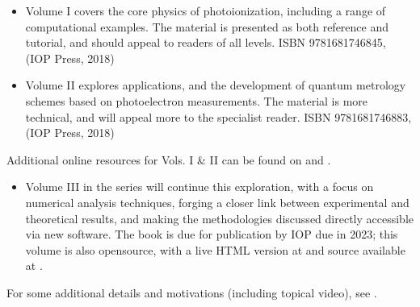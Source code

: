 \documentclass[letterpaper,10pt,english]{jupyterBook}
\begin{document}
\sphinxAtStartPar
{}
\begin{itemize}
\item {} 
\sphinxAtStartPar
Volume I covers the core physics of photoionization, including a range of computational examples. The material is presented as both reference and tutorial, and should appeal to readers of all levels. ISBN 978\sphinxhyphen{}1\sphinxhyphen{}6817\sphinxhyphen{}4684\sphinxhyphen{}5,  (IOP Press, 2018)

\item {} 
\sphinxAtStartPar
Volume II explores applications, and the development of quantum metrology schemes based on photoelectron measurements. The material is more technical, and will appeal more to the specialist reader. ISBN 978\sphinxhyphen{}1\sphinxhyphen{}6817\sphinxhyphen{}4688\sphinxhyphen{}3,  (IOP Press, 2018)

\end{itemize}

\sphinxAtStartPar
Additional online resources for Vols. I \& II can be found on  and .
\begin{itemize}
\item {} 
\sphinxAtStartPar
Volume III in the series will continue this exploration, with a focus on numerical analysis techniques, forging a closer link between experimental and theoretical results, and making the methodologies discussed directly accessible via new software. The book is due for publication by IOP due in 2023; this volume is also open\sphinxhyphen{}source, with a live HTML version at  and source available at .

\end{itemize}

\sphinxAtStartPar
For some additional details and motivations (including topical video), see .

\begin{DUlineblock}{0em}
\item[] 
\end{DUlineblock}
\end{document}
